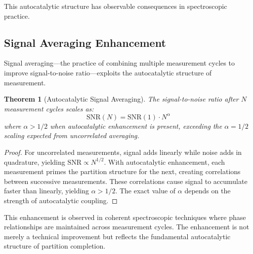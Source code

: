 \documentclass[twocolumn,10pt,a4paper]{article}
\newtheorem{theorem}{Theorem}[section]
\theoremstyle{definition}
\theoremstyle{remark}
\begin{document}
This autocatalytic structure has observable consequences in spectroscopic practice.

\subsection{Signal Averaging Enhancement}

Signal averaging—the practice of combining multiple measurement cycles to improve signal-to-noise ratio—exploits the autocatalytic structure of measurement.

\begin{theorem}[Autocatalytic Signal Averaging]
\label{thm:signal_averaging}
The signal-to-noise ratio after $N$ measurement cycles scales as:
\begin{equation}
\mathrm{SNR}(N) = \mathrm{SNR}(1) \cdot N^{\alpha}
\end{equation}
where $\alpha > 1/2$ when autocatalytic enhancement is present, exceeding the $\alpha = 1/2$ scaling expected from uncorrelated averaging.
\end{theorem}

\begin{proof}
For uncorrelated measurements, signal adds linearly while noise adds in quadrature, yielding $\mathrm{SNR} \propto N^{1/2}$. With autocatalytic enhancement, each measurement primes the partition structure for the next, creating correlations between successive measurements. These correlations cause signal to accumulate faster than linearly, yielding $\alpha > 1/2$. The exact value of $\alpha$ depends on the strength of autocatalytic coupling.
\end{proof}

This enhancement is observed in coherent spectroscopic techniques where phase relationships are maintained across measurement cycles. The enhancement is not merely a technical improvement but reflects the fundamental autocatalytic structure of partition completion.
\end{document}
